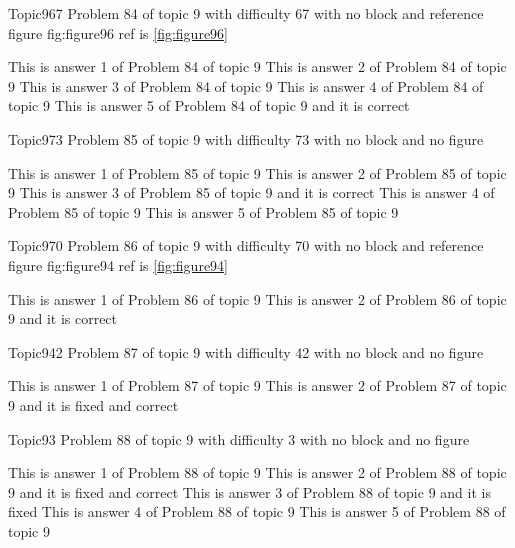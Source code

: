 \documentclass[master]{exam}
\begin{document}
\begin{problem}{Topic9}{67}
	Problem 84 of topic 9 with difficulty 67 with no block and reference figure fig:figure96 ref is \ref{fig:figure96}
	\begin{answers}
		\answer This is answer 1 of Problem 84 of topic 9 
		\answer This is answer 2 of Problem 84 of topic 9 
		\answer This is answer 3 of Problem 84 of topic 9 
		\answer This is answer 4 of Problem 84 of topic 9 
		\answer[correct] This is answer 5 of Problem 84 of topic 9 and it is correct
	\end{answers}
\end{problem}

\begin{problem}{Topic9}{73}
	Problem 85 of topic 9 with difficulty 73 with no block and no figure
	\begin{answers}
		\answer This is answer 1 of Problem 85 of topic 9 
		\answer This is answer 2 of Problem 85 of topic 9 
		\answer[correct] This is answer 3 of Problem 85 of topic 9 and it is correct
		\answer This is answer 4 of Problem 85 of topic 9 
		\answer This is answer 5 of Problem 85 of topic 9 
	\end{answers}
\end{problem}

\begin{problem}{Topic9}{70}
	Problem 86 of topic 9 with difficulty 70 with no block and reference figure fig:figure94 ref is \ref{fig:figure94}
	\begin{answers}
		\answer This is answer 1 of Problem 86 of topic 9 
		\answer[correct] This is answer 2 of Problem 86 of topic 9 and it is correct
	\end{answers}
\end{problem}

\begin{problem}{Topic9}{42}
	Problem 87 of topic 9 with difficulty 42 with no block and no figure
	\begin{answers}
		\answer This is answer 1 of Problem 87 of topic 9 
		 This is answer 2 of Problem 87 of topic 9 and it is fixed and correct
	\end{answers}
\end{problem}

\begin{problem}{Topic9}{3}
	Problem 88 of topic 9 with difficulty 3 with no block and no figure
	\begin{answers}
		\answer This is answer 1 of Problem 88 of topic 9 
		 This is answer 2 of Problem 88 of topic 9 and it is fixed and correct
		\answer[fixed] This is answer 3 of Problem 88 of topic 9 and it is fixed
		\answer This is answer 4 of Problem 88 of topic 9 
		\answer This is answer 5 of Problem 88 of topic 9 
	\end{answers}
\end{problem}
\end{document}
